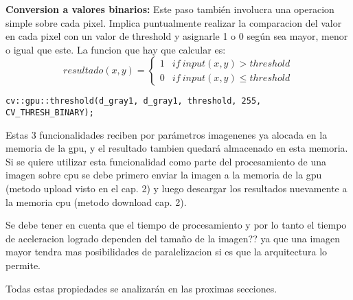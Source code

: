 \documentclass[a4paper,10pt]{report}
\begin{document}
 \textbf{Conversion a valores binarios:}  Este paso también involucra una operacion simple sobre cada pixel. 
 Implica puntualmente realizar la comparacion del valor en cada pixel con un valor de threshold y asignarle 1 o 0 según sea mayor, menor o igual que este.
 La funcion que hay que calcular es: 
 \begin{displaymath}
   resultado(x,y) = \left\{
     \begin{array}{lr}
       1 &  if\ input(x,y) > threshold\\
       0 &  if\ input(x,y) \leq threshold
     \end{array}
   \right.
\end{displaymath} 



 \begin{lstlisting}[columns=flexible,basicstyle=\ttfamily\small\bfseries]
cv::gpu::threshold(d_gray1, d_gray1, threshold, 255, CV_THRESH_BINARY);
\end{lstlisting}


 
 
 Estas 3 funcionalidades reciben por parámetros imagenenes ya alocada en la memoria de la gpu, y el resultado tambien quedará almacenado en esta memoria.
Si se quiere utilizar esta funcionalidad como parte del procesamiento de una imagen sobre cpu se debe primero enviar la imagen a la memoria de la gpu (metodo upload visto en el cap. 2)
y luego descargar los resultados nuevamente a la memoria cpu (metodo download cap. 2).
 
 Se debe tener en cuenta que el tiempo de procesamiento y por lo tanto el tiempo de aceleracion logrado dependen del tamaño de la imagen?? 
 ya que una imagen mayor tendra mas posibilidades de paralelizacion si es que la arquitectura lo permite.

 Todas estas propiedades se analizarán en las proximas secciones.

 
 
 
 
 
 
\end{document}
